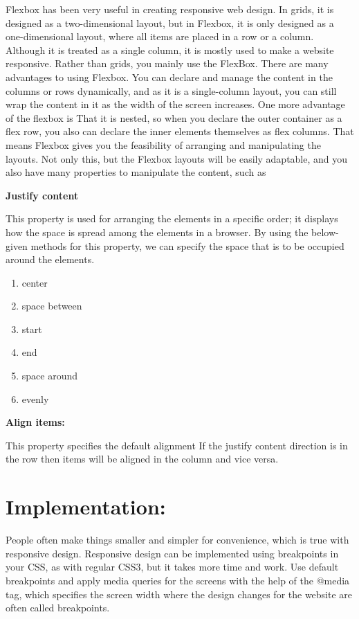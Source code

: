 \documentclass[conference]{IEEEtran}
\begin{document}
Flexbox has been very useful in creating responsive web design. In grids, it is designed as a two-dimensional layout, but in Flexbox, it is only designed as a one-dimensional layout, where all items are placed in a row or a column. Although it is treated as a single column, it is mostly used to make a website responsive. Rather than grids, you mainly use the FlexBox. There are many advantages to using Flexbox. You can declare and manage the content in the columns or rows dynamically, and as it is a single-column layout, you can still wrap the content in it as the width of the screen increases. One more advantage of the flexbox is That it is nested, so when you declare the outer container as a flex row, you also can declare the inner elements themselves as flex columns. That means Flexbox gives you the feasibility of arranging and manipulating the layouts. Not only this, but the Flexbox layouts will be easily adaptable, and you also have many properties to manipulate the content, such as

\textbf{Justify content}

This property is used for arranging the elements in a specific order; it displays how the space is spread among the elements in a browser. By using the below-given methods for this property, we can specify the space that is to be occupied around the elements.

\begin{enumerate}
\def\labelenumi{\arabic{enumi}.}
\item center
\item space between
\item   start
\item end
\item   space around
\item evenly
\end{enumerate}

\textbf{Align items:}

This property specifies the default alignment If the justify content direction is in the row then items will be aligned in the column and vice versa.

\section{Implementation:}

People often make things smaller and simpler for convenience, which is true with responsive design. Responsive design can be implemented using breakpoints in your CSS, as with regular CSS3, but it takes more time and work. Use default breakpoints and apply media queries for the screens with the help of the @media tag, which specifies the screen width where the design changes for the website are often called breakpoints.
\end{document}
